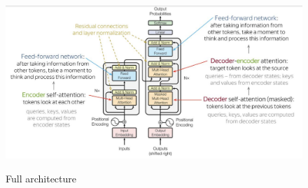 \documentclass[11pt]{article}
\begin{document}
    \begin{figure}[htbp]
        \centering\label{fig:figure}
        \includegraphics[scale=0.4]{figs/fig1}
        \caption{Full architecture}
    \end{figure}
\end{document}
